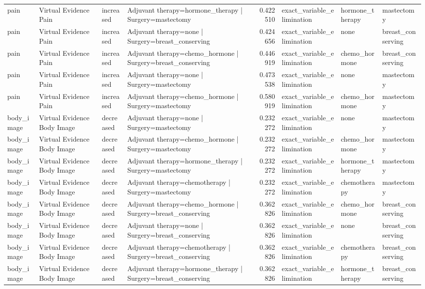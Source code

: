 \begin{table}
\begin{tabular}{llllrlll}
pain & Virtual Evidence Pain & increased & Adjuvant therapy=hormone\_therapy | Surgery=mastectomy & 0.422510 & exact\_variable\_elimination & hormone\_therapy & mastectomy \\
pain & Virtual Evidence Pain & increased & Adjuvant therapy=none | Surgery=breast\_conserving & 0.424656 & exact\_variable\_elimination & none & breast\_conserving \\
pain & Virtual Evidence Pain & increased & Adjuvant therapy=chemo\_hormone | Surgery=breast\_conserving & 0.446919 & exact\_variable\_elimination & chemo\_hormone & breast\_conserving \\
pain & Virtual Evidence Pain & increased & Adjuvant therapy=none | Surgery=mastectomy & 0.473538 & exact\_variable\_elimination & none & mastectomy \\
pain & Virtual Evidence Pain & increased & Adjuvant therapy=chemo\_hormone | Surgery=mastectomy & 0.580919 & exact\_variable\_elimination & chemo\_hormone & mastectomy \\
body\_image & Virtual Evidence Body Image & decreased & Adjuvant therapy=none | Surgery=mastectomy & 0.232272 & exact\_variable\_elimination & none & mastectomy \\
body\_image & Virtual Evidence Body Image & decreased & Adjuvant therapy=chemo\_hormone | Surgery=mastectomy & 0.232272 & exact\_variable\_elimination & chemo\_hormone & mastectomy \\
body\_image & Virtual Evidence Body Image & decreased & Adjuvant therapy=hormone\_therapy | Surgery=mastectomy & 0.232272 & exact\_variable\_elimination & hormone\_therapy & mastectomy \\
body\_image & Virtual Evidence Body Image & decreased & Adjuvant therapy=chemotherapy | Surgery=mastectomy & 0.232272 & exact\_variable\_elimination & chemotherapy & mastectomy \\
body\_image & Virtual Evidence Body Image & decreased & Adjuvant therapy=chemo\_hormone | Surgery=breast\_conserving & 0.362826 & exact\_variable\_elimination & chemo\_hormone & breast\_conserving \\
body\_image & Virtual Evidence Body Image & decreased & Adjuvant therapy=none | Surgery=breast\_conserving & 0.362826 & exact\_variable\_elimination & none & breast\_conserving \\
body\_image & Virtual Evidence Body Image & decreased & Adjuvant therapy=chemotherapy | Surgery=breast\_conserving & 0.362826 & exact\_variable\_elimination & chemotherapy & breast\_conserving \\
body\_image & Virtual Evidence Body Image & decreased & Adjuvant therapy=hormone\_therapy | Surgery=breast\_conserving & 0.362826 & exact\_variable\_elimination & hormone\_therapy & breast\_conserving \\
\bottomrule
\end{tabular}
\end{table}
